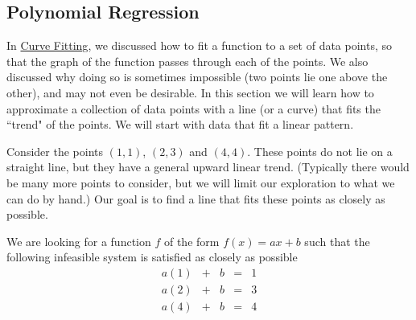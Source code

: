 \documentclass{ximera}
\begin{document}
\subsection*{Polynomial Regression}
In \href{https://ximera.osu.edu/oerlinalg/LinearAlgebra/APP-0070/main}{Curve Fitting}, we discussed how to fit a function to a set of data points, so that the graph of the function passes through each of the points.  We also discussed why doing so is sometimes impossible (two points lie one above the other), and may not even be desirable.  In this section we will learn how to approximate a collection of data points with a line (or a curve) that fits the ``trend" of the points.  We will start with data that fit a linear pattern.  

\begin{exploration}\label{exp:leastSq2}
    Consider the points $(1,1)$, $(2, 3)$ and $(4,4)$.  These points do not lie on a straight line, but they have a general upward linear trend.  (Typically there would be many more points to consider, but we will limit our exploration to what we can do by hand.)  Our goal is to find a line that fits these points as closely as possible.  

    We are looking for a function $f$ of the form $f(x)=ax+b$ such that the following infeasible system is satisfied as closely as possible
    $$\begin{matrix}a(1)&+&b&=&1\\a(2)&+&b&=&3\\a(4)&+&b&=&4\end{matrix}$$


\end{exploration}
\end{document}
